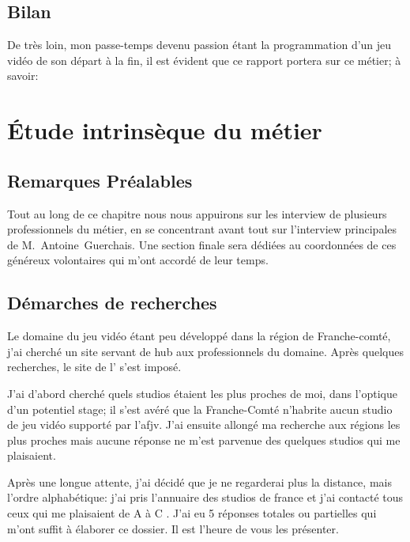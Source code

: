 \documentclass[12pt, a4paper]{report} %
\begin{document}
\section{Bilan}
De très loin, mon passe-temps devenu passion étant la programmation d'un jeu vidéo de son départ à la fin, il est évident que ce rapport portera sur ce métier; à savoir: 


\chapter{Étude intrinsèque du métier }
\section*{Remarques Préalables}
Tout au long de ce chapitre nous nous appuirons sur les interview de plusieurs professionnels du métier, en se concentrant avant tout sur l'interview principales de M.~Antoine~Guerchais. Une section finale sera dédiées au coordonnées de ces généreux volontaires qui m'ont accordé de leur temps.

\section{Démarches de recherches}
Le domaine du jeu vidéo étant peu développé dans la région de Franche-comté, j'ai cherché un site servant de hub aux professionnels du domaine. Après quelques recherches, le site de l' \href{http://www.afjv.com/index.php}{} s'est imposé. 

J'ai d'abord cherché quels studios étaient les plus proches de moi, dans l'optique d'un potentiel stage; il s'est avéré que la Franche-Comté n'habrite aucun studio de jeu vidéo supporté par l'\acrshort{afjv}. J'ai ensuite allongé ma recherche aux régions les plus proches mais aucune réponse ne m'est parvenue des quelques studios qui me plaisaient.

Après une longue attente, j'ai décidé que je ne regarderai plus la distance, mais l'ordre alphabétique: j'ai pris l'annuaire des studios de france et j'ai contacté tous ceux qui me plaisaient de A à C . J'ai eu 5 réponses totales ou partielles qui m'ont suffit à élaborer ce dossier. Il est l'heure de vous les présenter.
\end{document}
